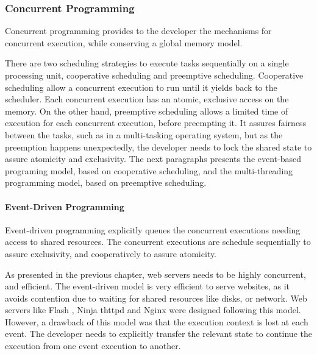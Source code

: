 \subsubsection{Concurrent Programming} \label{chapter3:software-maintainability:performance:concurrent-programming}


Concurrent programming provides to the developer the mechanisms for concurrent execution, while conserving a global memory model.


There are two scheduling strategies to execute tasks sequentially on a single processing unit, cooperative scheduling and preemptive scheduling.
Cooperative scheduling allow a concurrent execution to run until it yields back to the scheduler.
Each concurrent execution has an atomic, exclusive access on the memory.
On the other hand, preemptive scheduling allows a limited time of execution for each concurrent execution, before preempting it.
It assures fairness between the tasks, such as in a multi-tasking operating system, but as the preemption happens unexpectedly, the developer needs to lock the shared state to assure atomicity and exclusivity.
The next paragraphs presents the event-based programing model, based on cooperative scheduling, and the multi-threading programming model, based on preemptive scheduling.

\paragraph{Event-Driven Programming}

Event-driven programming explicitly queues the concurrent executions needing access to shared resources.
The concurrent executions are schedule sequentially to assure exclusivity, and cooperatively to assure atomicity.

As presented in the previous chapter, web servers needs to be highly concurrent, and efficient.
The event-driven model is very efficient to serve websites, as it avoids contention due to waiting for shared resources like disks, or network.
Web servers like Flash \cite{Pai1999}, Ninja \cite{Gribble2001} thttpd and Nginx were designed following this model.
However, a drawback of this model was that the execution context is lost at each event.
The developer needs to explicitly transfer the relevant state to continue the execution from one event execution to another.

